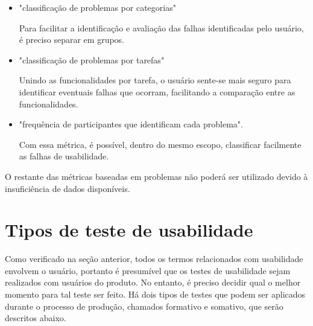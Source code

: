 \begin{itemize}
\item "classificação de problemas  por categorias"

Para facilitar a identificação e avaliação das falhas identificadas pelo usuário, é preciso separar em grupos.

\item "classificação de problemas por tarefas" 

Unindo as funcionalidades por tarefa, o usuário sente-se mais seguro para identificar eventuais falhas que ocorram, facilitando a comparação entre as funcionalidades.

\item "frequência de participantes que identificam cada problema". 

Com essa métrica, é possível, dentro do mesmo escopo, classificar facilmente as falhas de usabilidade.

\end{itemize}

O restante das métricas baseadas em problemas não poderá ser utilizado devido à insuficiência de dados disponíveis.





\section{Tipos de teste de usabilidade}
\label{sec:metodos-aplicacao}
    Como verificado na seção anterior, todos os termos relacionados com usabilidade envolvem o usuário, portanto é presumível que os testes de usabilidade sejam realizados com usuários do produto. No entanto, é preciso decidir qual o melhor momento para tal teste ser feito. Há dois tipos de testes que podem ser aplicados durante o processo de produção, chamados formativo e somativo, que serão descritos abaixo.


